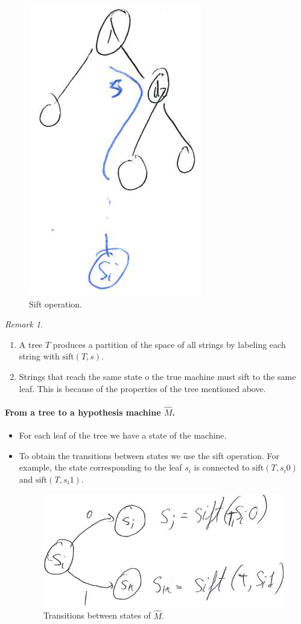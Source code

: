 \documentclass[12pt, letterpaper]{article}
\numberwithin{equation}{section} %
\newcommand{\mr}{\mathrm}
\theoremstyle{definition}
\theoremstyle{remark}
\newtheorem{remark}[theorem]{Remark}
\begin{document}
\begin{enumerate}
    \begin{figure}[H]
    \centering
    \includegraphics[width=0.1\linewidth]{../img/sift-tree.png}
    \caption{Sift operation.}
    \end{figure}
    \begin{remark}~
    \begin{enumerate}[-]
    \item A tree $T$ produces a partition of the space of all strings by labeling each string with $\mr{sift}(T,s)$.
    \item Strings that reach the same state o the true machine must sift to the same leaf. This is because of the properties of the tree mentioned above.
    \end{enumerate}
    \end{remark}

    \paragraph{From a tree to a hypothesis machine $\widehat M$.}
    \begin{itemize}
    \item For each leaf of the tree we have a state of the machine.
    \item To obtain the transitions between states we use the sift operation. For example, the state corresponding to the leaf $s_i$ is connected to $\mr{sift}(T, s_i0)$ and  $\mr{sift}(T, s_i1)$.
        \begin{figure}[H]
        \centering
        \includegraphics[width=0.2\linewidth]{../img/transitions.png}
        \caption{Transitions between states of $\widehat M$.}
        \end{figure}
    \end{itemize}


\end{enumerate}
\end{document}
